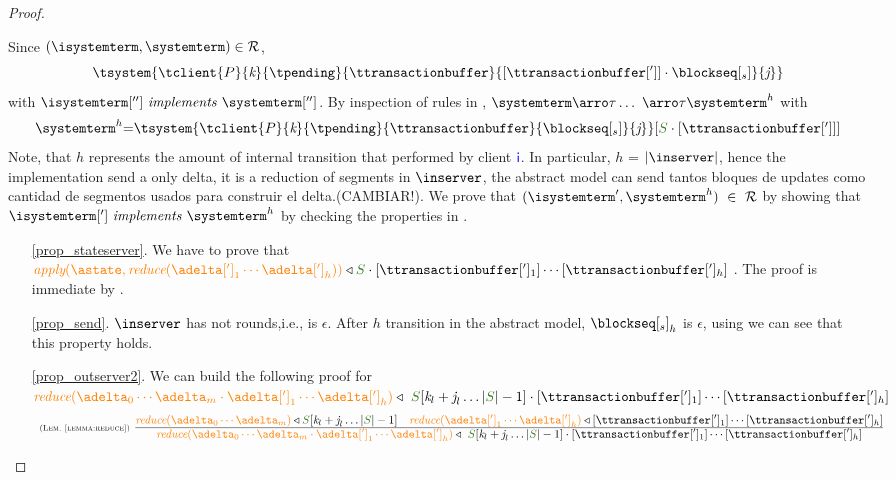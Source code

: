 \begin{proof}
\begin{itemize}
\begin{itemize}
				Since $(\isystemterm,\systemterm)\in \mathcal{R}$,
				\[\tsystem{\tclient{\tprogram}{\tknown}{\tpending}{\ttransactionbuffer}{[\tsenthead] \cdot \tsent}{\treceivebuffer}} \]
				with $\implements{\isystemterm['']}{\systemterm['']}$. By inspection of rules in \figref{}, 
				$\systemterm \arroi{\tau} \ldots\ \arroi{\tau} \systemterm^{h}$ with
				\[\begin{array}{r@{=}l}
					\systemterm^{h} &  \tsystem{\tclient{\tprogram}{\tknown}{\tpending}{\ttransactionbuffer}{\tsent}{\treceivebuffer}}[\queuemessage \cdot [\tsenthead]]
				  \end{array}		
				\]
				Note, that $h$ represents the amount of internal transition that performed by client $\textcolor{blue}{{\sf i}}$. In particular,  $h$ = $|\inserver|$, hence the implementation send a only delta, it is a reduction of segments in $\inserver$, the abstract model can send tantos bloques de updates como cantidad de segmentos usados para construir el delta.(CAMBIAR!). 
				We  prove that $(\isystemterm',\systemterm^{h}) \ \in \ \mathcal{R}$ by showing that $\implements{\isystemterm[']}{\systemterm^{h}}$ 
				by checking the properties in .	
					\begin{enumerate}
							\item[\ref{prop_stateserver}.] We have to prove that 
						$\iapply{\astate}{\ireduce{\adelta[']_1\cdots\adelta[']_h}} \triangleleft \queuemessage\cdot [\tsenthead_1]\cdots[\tsenthead_h] \ $. The proof is immediate by .
						\item[\ref{prop_send}.] $\inserver$ has not rounds,i.e., is $\epsilon$. After $h$ transition in the abstract model, ${\tsent}_h$ is $\epsilon$, using \triangemptydelta we can see that this property holds.
						\item[\ref{prop_outserver2}.] We can build the following proof for 
						$\ireduce{\adelta_0\cdots\adelta_m\cdot\adelta[']_1\cdots\adelta[']_h} \triangleleft \ \queuemessage[\tknown_l + \treceivebuffer_l  \ldots  |\queuemessage| - 1]\cdot [\tsenthead_1]\cdots[\tsenthead_h]$
						\[
						  \mathrulean{\lemref{lemma:reduce}}
						  {
								\ireduce{\adelta_0\cdots\adelta_m}\triangleleft  \queuemessage[\tknown_l + \treceivebuffer_l \ldots  |\queuemessage| - 1]
								\quad 
								\ireduce{\adelta[']_1\cdots\adelta[']_h} \triangleleft [\tsenthead_1]\cdots[\tsenthead_h]							
							}
  						{\ireduce{\adelta_0\cdots\adelta_m\cdot\adelta[']_1\cdots\adelta[']_h} \triangleleft \ \queuemessage[\tknown_l + \treceivebuffer_l  \ldots  |\queuemessage| - 1]\cdot [\tsenthead_1]\cdots[\tsenthead_h]}  
					\]
											

\end{enumerate}
\end{itemize}
\end{itemize}
\end{proof}
